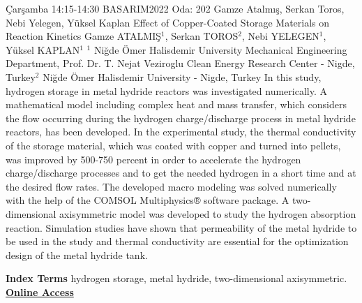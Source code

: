 
    \begin{abstract_basarim}
    {Çarşamba 14:15-14:30}
    {BASARIM2022}
    {Oda: 202}
    {Gamze Atalmış, Serkan Toros, Nebi Yelegen, Yüksel Kaplan}
    {Effect of Copper-Coated Storage Materials on Reaction Kinetics}
    {%
    Gamze ATALMIŞ$^{1}$, Serkan TOROS$^{2}$, Nebi YELEGEN$^{1}$, Yüksel KAPLAN$^{1}$}
    {%
    }
    {%
    $^1$ Niğde Ömer Halisdemir University Mechanical Engineering Department, Prof. Dr. T. Nejat Veziroglu Clean Energy Research Center - Nigde, Turkey\newline{}$^2$ Niğde Ömer Halisdemir University - Nigde, Turkey}
    In this study, hydrogen storage in metal hydride reactors was investigated numerically. A mathematical model including complex heat and mass transfer, which considers the flow occurring during the hydrogen charge/discharge process in metal hydride reactors, has been developed. In the experimental study, the thermal conductivity of the storage material, which was coated with copper and turned into pellets, was improved by 500-750 percent in order to accelerate the hydrogen charge/discharge processes and to get the needed hydrogen in a short time and at the desired flow rates. The developed macro modeling was solved numerically with the help of the COMSOL Multiphysics® software package. A two-dimensional axisymmetric model was developed to study the hydrogen absorption reaction. Simulation studies have shown that permeability of the metal hydride to be used in the study and thermal conductivity are essential for the optimization design of the metal hydride tank. 
    
            \textbf{Index Terms} \newline{}hydrogen storage, metal hydride, two-dimensional axisymmetric.
     \newline\newline\noindent \href{https://drive.google.com/file/d/1PZiPStwp-8dYWlP1FF3Pwcvxqa3uXY1x/view?usp=drivesdk}{\bfseries Online Access}
    \end{abstract_basarim}
    
